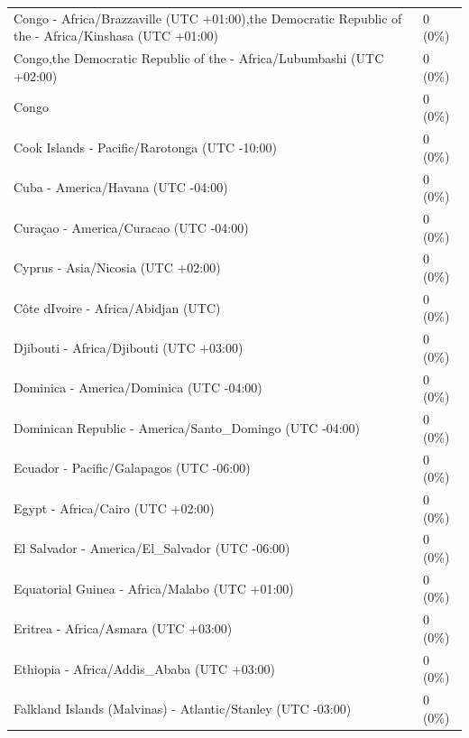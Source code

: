 \begin{appendix}
\begin{table}
{\begin{tabular}[t]{ll}
\hspace{1em}Congo - Africa/Brazzaville (UTC +01:00),the Democratic Republic of the - Africa/Kinshasa (UTC +01:00) & 0 (0\%)\\
\hspace{1em}Congo,the Democratic Republic of the - Africa/Lubumbashi (UTC +02:00) & 0 (0\%)\\
\hspace{1em}Congo & 0 (0\%)\\
\addlinespace
\hspace{1em}Cook Islands - Pacific/Rarotonga (UTC -10:00) & 0 (0\%)\\
\hspace{1em}Cuba - America/Havana (UTC -04:00) & 0 (0\%)\\
\hspace{1em}Curaçao - America/Curacao (UTC -04:00) & 0 (0\%)\\
\hspace{1em}Cyprus - Asia/Nicosia (UTC +02:00) & 0 (0\%)\\
\hspace{1em}Côte dIvoire - Africa/Abidjan (UTC) & 0 (0\%)\\
\addlinespace
\hspace{1em}Djibouti - Africa/Djibouti (UTC +03:00) & 0 (0\%)\\
\hspace{1em}Dominica - America/Dominica (UTC -04:00) & 0 (0\%)\\
\hspace{1em}Dominican Republic - America/Santo\_Domingo (UTC -04:00) & 0 (0\%)\\
\hspace{1em}Ecuador - Pacific/Galapagos (UTC -06:00) & 0 (0\%)\\
\hspace{1em}Egypt - Africa/Cairo (UTC +02:00) & 0 (0\%)\\
\addlinespace
\hspace{1em}El Salvador - America/El\_Salvador (UTC -06:00) & 0 (0\%)\\
\hspace{1em}Equatorial Guinea - Africa/Malabo (UTC +01:00) & 0 (0\%)\\
\hspace{1em}Eritrea - Africa/Asmara (UTC +03:00) & 0 (0\%)\\
\hspace{1em}Ethiopia - Africa/Addis\_Ababa (UTC +03:00) & 0 (0\%)\\
\hspace{1em}Falkland Islands (Malvinas) - Atlantic/Stanley (UTC -03:00) & 0 (0\%)\\

\end{tabular}}
\end{table}
\end{appendix}
